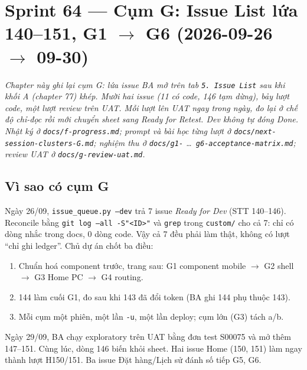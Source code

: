 \chapter{Sprint 64 --- Cụm G: Issue List lứa 140--151, G1 $\to$ G6 (2026-09-26 $\to$ 09-30)}

\emph{Chapter này ghi lại cụm G: lứa issue BA mở trên tab \texttt{5. Issue List} sau khi khối A (chapter 77) khép.
Mười hai issue (11 có code, 146 tạm dừng), bảy lượt code, một lượt review trên UAT. Mỗi lượt lên UAT ngay trong ngày, đo lại ở chế độ chỉ-đọc rồi
mới chuyển sheet sang \emph{Ready for Retest}. Dev không tự đóng \emph{Done}. Nhật ký ở \texttt{docs/f-progress.md}; prompt
và bài học từng lượt ở \texttt{docs/next-session-clusters-G.md}; nghiệm thu ở \texttt{docs/g1-} \ldots\
\texttt{g6-acceptance-matrix.md}; review UAT ở \texttt{docs/g-review-uat.md}.}

\section{Vì sao có cụm G}

Ngày 26/09, \texttt{issue\_queue.py --dev} trả 7 issue \emph{Ready for Dev} (STT 140--146). Reconcile bằng
\texttt{git log --all -S"<ID>"} và \texttt{grep} trong \texttt{custom/} cho cả 7: chỉ có dòng nhắc trong docs, 0 dòng code.
Vậy cả 7 đều phải làm thật, không có lượt ``chỉ ghi ledger''. Chủ dự án chốt ba điều:
\begin{enumerate}[nosep]
\item Chuẩn hoá component trước, trang sau: G1 component mobile $\to$ G2 shell $\to$ G3 Home PC $\to$ G4 routing.
\item 144 làm cuối G1, đo sau khi 143 đã đổi token (BA ghi 144 phụ thuộc 143).
\item Mỗi cụm một phiên, một lần \texttt{-u}, một lần deploy; cụm lớn (G3) tách a/b.
\end{enumerate}
Ngày 29/09, BA chạy exploratory trên UAT bằng đơn test S00075 và mở thêm 147--151. Cùng lúc, dòng 146 biến khỏi sheet.
Hai issue Home (150, 151) làm ngay thành lượt H150/151. Ba issue Đặt hàng/Lịch sử đánh số tiếp G5, G6.

